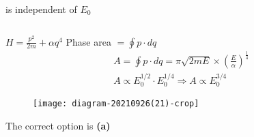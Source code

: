 \begin{enumerate}
\begin{tasks}
	\task[\textbf{D.}]is independent of $E_{0}$
\end{tasks}
\begin{answer}$\left. \right. $\\
\begin{minipage}{0.5\textwidth}
$H=\frac{p^{2}}{2 m}+\alpha q^{4}$
Phase area $=\oint p \cdot d q$
$$
\begin{aligned}
&A=\oint p \cdot d q=\pi \sqrt{2 m E} \times\left(\frac{E}{\alpha}\right)^{\frac{1}{4}} \\
&A \propto E_{0}^{1 / 2} \cdot E_{0}^{1 / 4} \Rightarrow A \propto E_{0}^{3 / 4}
\end{aligned}
$$	
\end{minipage}
\begin{minipage}{0.5\textwidth}
	\begin{figure}[H]
		\centering
		\texttt{[image: diagram-20210926(21)-crop]}
	\end{figure}
\end{minipage}
The correct option is \textbf{(a)}	
\end{answer}


\end{enumerate}
